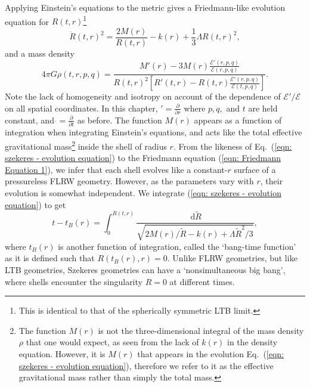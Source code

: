 \documentclass[a4paper,12pt]{report}
\newcommand{\diff}[1]{\,\text{d}{#1}}
\newcommand{\pderiv}[2]{\frac{\partial{#1}}{\partial{#2}}}
\renewcommand{\eqref}[1]{Eq.~({#1})}
\begin{document}
Applying Einstein's equations to the metric gives a Friedmann-like evolution equation for $R(t,r)$\footnote{This is identical to that of the spherically symmetric LTB limit.}
\begin{equation}\label{eqn: szekeres - evolution equation}
  \dot{R}(t,r)^2 = \frac{2M(r)}{R(t,r)} - k(r) + \frac{1}{3}\Lambda R(t,r)^2,
\end{equation}
and a mass density
\begin{equation} \label{eqn: szekeres - mass density equation}
  4\pi G \rho(t,r,p,q) = \frac{M'(r)-3M(r)\frac{\mathcal{E}'(r,p,q)}{\mathcal{E}(r,p,q)}}{R(t,r)^2\left[R'(t,r)-R(t,r)\frac{\mathcal{E}'(r,p,q)}{\mathcal{E}(t,p,q)}\right]}.
\end{equation}
Note the lack of homogeneity and isotropy on account of the dependence of $\mathcal{E}'/\mathcal{E}$ on all spatial coordinates. In this chapter, $'=\pderiv{}{r}$ where $p, q,$ and $t$ are held constant, and $\dot{}=\pderiv{}{t}$ as before. The function $M(r)$ appears as a function of integration when integrating Einstein's equations, and acts like the total effective gravitational mass\footnote{The function $M(r)$ is not the three-dimensional integral of the mass density $\rho$ that one would expect, as seen from the lack of $k(r)$ in the density equation. However, it is $M(r)$ that appears in the evolution \eqref{\ref{eqn: szekeres - evolution equation}}, therefore we refer to it as the effective gravitational mass rather than simply the total mass.} inside the shell of radius $r$. From the likeness of \eqref{\ref{eqn: szekeres - evolution equation}} to the Friedmann equation (\ref{eqn: Friedmann Equation 1}), we infer that each shell evolves like a constant-$r$ surface of a pressureless FLRW geometry. However, as the parameters vary with $r$, their evolution is somewhat independent. We integrate (\ref{eqn: szekeres - evolution equation}) to get
\begin{equation}\label{eqn: bang time integral}
  t-t_B(r) = \int_0^{R(t,r)}\frac{\diff{\tilde{R}}}{\sqrt{2M(r)/\tilde{R} - k(r) + \Lambda \tilde{R}^2/3}},
\end{equation}
where $t_B(r)$ is another function of integration, called the `bang-time function' as it is defined such that $R(t_B(r),r)=0$. Unlike FLRW geometries, but like LTB geometries, Szekeres geometries can have a `nonsimultaneous big bang', where shells encounter the singularity $R=0$ at different times.
\end{document}
